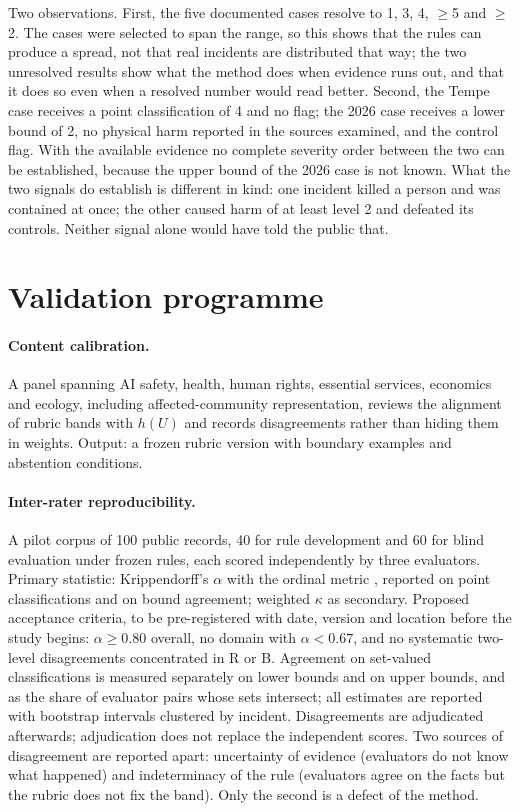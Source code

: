 \documentclass[11pt,a4paper]{article}
\begin{document}
Two observations. First, the five documented cases resolve to 1, 3, 4, $\ge$5 and $\ge$2. The cases were selected to span the range, so this shows that the rules can produce a spread, not that real incidents are distributed that way; the two unresolved results show what the method does when evidence runs out, and that it does so even when a resolved number would read better. Second, the Tempe case receives a point classification of 4 and no flag; the 2026 case receives a lower bound of 2, no physical harm reported in the sources examined, and the control flag. With the available evidence no complete severity order between the two can be established, because the upper bound of the 2026 case is not known. What the two signals do establish is different in kind: one incident killed a person and was contained at once; the other caused harm of at least level 2 and defeated its controls. Neither signal alone would have told the public that.

\section{Validation programme}
\label{sec:validation}

\paragraph{Content calibration.} A panel spanning AI safety, health, human rights, essential services, economics and ecology, including affected-community representation, reviews the alignment of rubric bands with $h(U)$ and records disagreements rather than hiding them in weights. Output: a frozen rubric version with boundary examples and abstention conditions.

\paragraph{Inter-rater reproducibility.} A pilot corpus of 100 public records, 40 for rule development and 60 for blind evaluation under frozen rules, each scored independently by three evaluators. Primary statistic: Krippendorff's $\alpha$ with the ordinal metric \citep{krippendorff2019}, reported on point classifications and on bound agreement; weighted $\kappa$ \citep{cohen1968} as secondary. Proposed acceptance criteria, to be pre-registered with date, version and location before the study begins: $\alpha \ge 0.80$ overall, no domain with $\alpha < 0.67$, and no systematic two-level disagreements concentrated in R or B. Agreement on set-valued classifications is measured separately on lower bounds and on upper bounds, and as the share of evaluator pairs whose sets intersect; all estimates are reported with bootstrap intervals clustered by incident. Disagreements are adjudicated afterwards; adjudication does not replace the independent scores. Two sources of disagreement are reported apart: uncertainty of evidence (evaluators do not know what happened) and indeterminacy of the rule (evaluators agree on the facts but the rubric does not fix the band). Only the second is a defect of the method.
\end{document}
